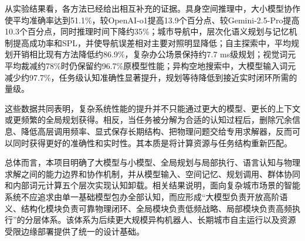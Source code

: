 从实验结果看，各方法已经给出相互补充的证据。具身空间推理中，大小模型协作使平均准确率达到51.1\%，较OpenAI-o1提高13.9个百分点、较Gemini-2.5-Pro提高10.3个百分点，同时推理时间下降约35\%；城市导航中，层次化语义规划与记忆机制提高成功率和SPL，并使导航误差相对主要对照明显降低；自主探索中，平均规划开销相比现有方法降低约86.9\%，复杂办公场景保持约7.7 ms级规划；视觉词元平均裁减约78\%时仍保留约96.7\%原模型性能；异构空地搜索中，大模型输入词元减少约97.7\%，任务级认知准确性显著提升，规划等待降低到接近实时闭环所需的量级。

这些数据共同表明，复杂系统性能的提升并不只能通过更大的模型、更长的上下文或更频繁的全局规划获得。相反，当任务被分解为合适的认知过程后，删除冗余信息、降低高层调用频率、显式保存长期结构、把物理问题交给专用求解器，反而可以同时获得更好的准确性和实时性。其本质是将计算资源与任务结构重新匹配。

总体而言，本项目明确了大模型与小模型、全局规划与局部执行、语言认知与物理求解之间的能力边界和协作机制，并从模型输入、空间记忆、规划调用、群体协同和内部词元计算五个层次实现认知卸载。相关结果说明，面向复杂城市场景的智能系统不应追求由单一基础模型包办全部认知，而应形成“大模型负责开放高阶语义、结构化模块负责可靠物理闭环、全局模块负责低频战略、局部模块负责高频执行”的分层体系。该体系为后续更大规模异构机器人、长期城市自主运行以及资源受限边缘部署提供了统一的设计基础。
\clearpage